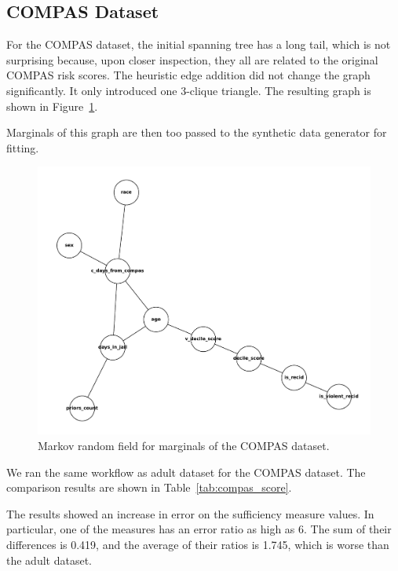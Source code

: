 \documentclass[manuscript,screen,review,anonymous]{acmart}
\begin{document}
\subsection{COMPAS Dataset}

For the COMPAS dataset, the initial spanning tree has a long tail, which is not surprising because, upon closer inspection, they all are related to the original COMPAS risk scores. The heuristic edge addition did not change the graph significantly. It only introduced one 3-clique triangle. The resulting graph is shown in Figure~\ref{fig:compas_mst}.

Marginals of this graph are then too passed to the synthetic data generator for fitting.

\begin{figure}[h]
\centering
\includegraphics[width=\linewidth]{compas_mst}
\caption{Markov random field for marginals of the COMPAS dataset.}
\label{fig:compas_mst}
\end{figure}

We ran the same workflow as adult dataset for the COMPAS dataset. The comparison results are shown in Table~\ref{tab:compas_score}.

The results showed an increase in error on the sufficiency measure values. In particular, one of the measures has an error ratio as high as 6. The sum of their differences is 0.419, and the average of their ratios is 1.745, which is worse than the adult dataset.
\end{document}
